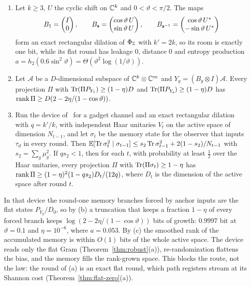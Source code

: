 \begin{theorem}\label{thm:global-haar}
\begin{enumerate}[label=(\alph*),itemsep=1pt]
\item Let $k\ge3$, $U$ the cyclic shift on $\mathbb C^k$ and $0<\vartheta<\pi/2$. The maps
\[
B_1=\begin{pmatrix}I\\0\end{pmatrix},\qquad B_\mathsf a=\begin{pmatrix}\cos\vartheta\,U\\\sin\vartheta\,U\end{pmatrix},\qquad
B_{\mathsf a^{-1}}=\begin{pmatrix}\cos\vartheta\,U^*\\-\sin\vartheta\,U^*\end{pmatrix}
\]
form an exact rectangular dilation of $\Phi_\mathbb Z$ with $k'=2k$, so its room is exactly one bit, while its flat round has leakage $0$, distance $0$ and
entropy production $a=h_2(0.6\sin^2\vartheta)=\Theta(\vartheta^2\log(1/\vartheta))$.
\item Let $\mathcal A$ be a $D$-dimensional subspace of $\mathbb C^k\otimes\mathbb C^m$ and $Y_g=(B_g\otimes I)\mathcal A$. Every projection $\Pi$ with
$\operatorname{Tr}(\Pi P_{Y_1})\ge(1-\eta)D$ and $\operatorname{Tr}(\Pi P_{Y_\mathsf a})\ge(1-\eta)D$ has $\operatorname{rank}\Pi\ge D(2-2\eta/(1-\cos\vartheta))$.
\item Run the device of~\cite[Theorem~12.2]{DouglasMghirbiC} for a gadget channel and an exact rectangular dilation with $q=k'/k$, with independent Haar
unitaries $V_t$ on the active space of dimension $N_{t-1}$, and let $\sigma_t$ be the memory state for the observer that inputs $\tau_d$ in every round.
Then $\mathbb E[\operatorname{Tr}\sigma_t^2\mid\sigma_{t-1}]\le s_2\operatorname{Tr}\sigma_{t-1}^2+2(1-s_2)/N_{t-1}$ with $s_2=\sum_g\mu_g^2$. If $qs_2<1$, then for each $t$, with probability at
least $\frac12$ over the Haar unitaries, every projection $\Pi$ with $\operatorname{Tr}(\Pi\sigma_t)\ge1-\eta$ has $\operatorname{rank}\Pi\ge(1-\eta)^2(1-qs_2)D_t/(12q)$, where $D_t$ is
the dimension of the active space after round $t$.
\end{enumerate}
\end{theorem}

In that device the round-one memory branches forced by anchor inputs are the flat states $P_{Y_g}/D_0$, so by (b) a truncation that keeps a fraction
$1-\eta$ of every forced branch keeps $\log(2-2\eta/(1-\cos\vartheta))$ bits of growth: $0.9997$ bit at $\vartheta=0.1$ and $\eta=10^{-6}$, where
$a=0.053$. By (c) the smoothed rank of the accumulated memory is within $O(1)$ bits of the whole active space. The device reads only the flat Gram
(Theorem~\ref{thm:robust}(a)), re-randomization flattens the bias, and the memory fills the rank-grown space. This blocks the route, not the law:
the round of (a) is an exact flat round, which path registers stream at its Shannon cost (Theorem~\ref{thm:flat-zero}(a)).


